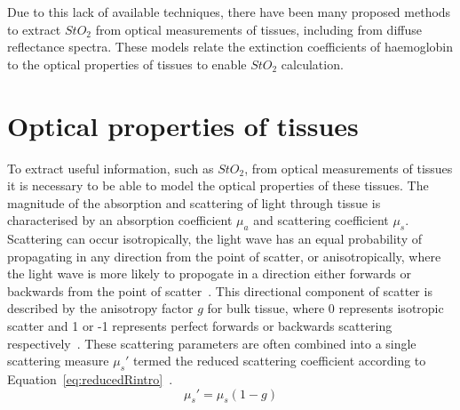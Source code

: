 Due to this lack of available techniques, there have been many proposed methods to extract $StO_2$ from optical measurements of tissues, including from diffuse reflectance spectra. These models relate the extinction coefficients of haemoglobin to the optical properties of tissues to enable $StO_2$ calculation. 

\section{Optical properties of tissues}\label{sec:introoptics}
To extract useful information, such as $StO_2$, from optical measurements of tissues it is necessary to be able to model the optical properties of these tissues. The magnitude of the absorption and scattering of light through tissue is characterised by an absorption coefficient $\mu_a$ and scattering coefficient $\mu_s$. Scattering can occur isotropically, the light wave has an equal probability of propagating in any direction from the point of scatter, or anisotropically, where the light wave is more likely to propogate in a direction either forwards or backwards from the point of scatter~\citep{Jacques2013}. This directional component of scatter is described by the anisotropy factor $g$ for bulk tissue, where 0 represents isotropic scatter and 1 or -1 represents perfect forwards or backwards scattering respectively~\citep{Jacques2013}. These scattering parameters are often combined into a single scattering measure $\mu_s'$ termed the reduced scattering coefficient according to Equation~\eqref{eq:reducedRintro}~\citep{Jacques2013}. 
\begin{equation}
    \mu_s' = \mu_s(1-g)
    \label{eq:reducedRintro}
\end{equation}

